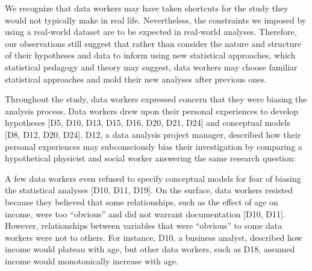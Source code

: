 We recognize that data workers may have taken shortcuts for the study they would
not typically make in real life. Nevertheless, the constraints we imposed by
using a real-world dataset are to be expected in real-world analyses. Therefore,
our observations still suggest that rather than consider the nature and
structure of their hypotheses and data to inform using new statistical
approaches, which statistical pedagogy and theory may suggest, data workers may
choose familiar statistical approaches and mold their new analyses after
previous ones. 



Throughout the study, data workers expressed concern that they were biasing the
analysis process. Data workers drew upon their personal experiences to develop
hypotheses [D5, D10, D13, D15, D16, D20, D21, D24] and conceptual models [D8,
D12, D20, D24]. D12, a data analysis project manager, described how their personal experiences may subconsciously
bias their investigation by comparing a hypothetical physicist and social worker
answering the same research question: 

A few data workers even refused to specify conceptual models for fear of biasing the
statistical analyses [D10, D11, D19]. On the surface, data workers resisted
because they believed that some relationships, such as the effect of age on
income, were too ``obvious'' and did not warrant documentation [D10, D11].
However, relationships between variables that were ``obvious'' to some
data workers were not to others. For instance, D10, a business analyst, described how income would
plateau with age, but other data workers, such as D18, assumed income would monotonically increase with age.

